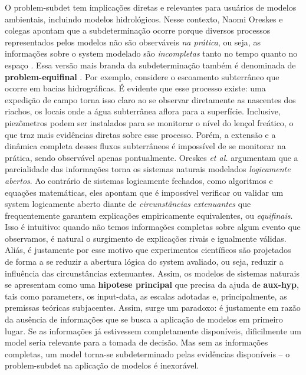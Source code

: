 \documentclass[./main.tex]{subfiles}
\begin{document}
\par O \gls{problem-subdet} tem implicações diretas e relevantes para usuários de modelos ambientais, incluindo modelos hidrológicos. Nesse contexto, Naomi Oreskes e colegas apontam que a subdeterminação ocorre porque diversos processos representados pelos modelos não são observáveis \textit{na prática}, ou seja, as informações sobre o \gls{system} modelado são \textit{incompletas} tanto no tempo quanto no espaço \cite{Oreskes1994}. Essa versão mais branda da subdeterminação também é denominada de \textbf{\gls{problem-equifinal}} \cite{Beven2006}. Por exemplo, considere o escoamento subterrâneo que ocorre em bacias hidrográficas. É evidente que esse processo existe: uma expedição de campo torna isso claro ao se observar diretamente as nascentes dos riachos, os locais onde a água subterrânea aflora para a superfície. Inclusive, piezômetros podem ser instalados para se monitorar o nível do lençol freático, o que traz mais evidências diretas sobre esse processo. Porém, a extensão e a dinâmica completa desses fluxos subterrâneos é impossível de se monitorar na prática, sendo observável apenas pontualmente. Oreskes \textit{et al.} argumentam que a parcialidade das informações torna os sistemas naturais modelados \textit{logicamente abertos}. Ao contrário de sistemas logicamente fechados, como algoritmos e equações matemáticas, eles apontam que é impossível verificar ou validar um \gls{system} logicamente aberto diante de \textit{circunstâncias extenuantes} que frequentemente garantem explicações empiricamente equivalentes, ou \textit{equifinais}. Isso é intuitivo: quando não temos informações completas sobre algum evento que observamos, é natural o surgimento de explicações rivais e igualmente válidas. Aliás, é justamente por esse motivo que experimentos científicos são projetados de forma a se reduzir a abertura lógica do \gls{system} avaliado, ou seja, reduzir a influência das circunstâncias extenuantes. Assim, os modelos de sistemas naturais se apresentam como uma \textbf{\gls{hipotese} principal} que precisa da ajuda de \textbf{\gls{aux-hyp}}, tais como \gls{parameters}, os \gls{input-data}, as escalas adotadas e, principalmente, as premissas teóricas subjacentes. Assim, surge um paradoxo: é justamente em razão da ausência de informações que se busca a aplicação de modelos em primeiro lugar. Se as informações já estivessem completamente disponíveis, dificilmente um \gls{model} seria relevante para a tomada de decisão. Mas sem as informações completas, um \gls{model} torna-se subdeterminado pelas evidências disponíveis -- o \gls{problem-subdet} na aplicação de modelos é inexorável.
\end{document}
